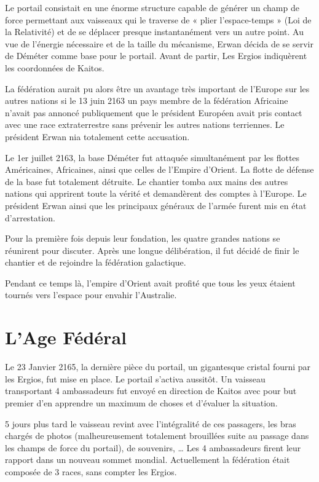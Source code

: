 \begin{multicols}{2}
Le portail consistait en une énorme structure capable de générer un champ de force permettant aux vaisseaux qui le traverse de « plier l’espace-temps » (Loi de la Relativité) et de se déplacer presque instantanément vers un autre point. Au vue de l’énergie nécessaire et de la taille du mécanisme, Erwan décida de se servir de Déméter comme base pour le portail. Avant de partir, Les Ergios indiquèrent les coordonnées de Kaitos.

La fédération aurait pu alors être un avantage très important de l’Europe sur les autres nations si le 13 juin 2163 un pays membre de la fédération Africaine n’avait pas annoncé publiquement que le président Européen avait pris contact avec une race extraterrestre sans prévenir les autres nations terriennes. Le président Erwan nia totalement cette accusation.

Le 1er juillet 2163, la base Déméter fut attaquée simultanément par les flottes Américaines, Africaines, ainsi que celles de l’Empire d’Orient. La flotte de défense de la base fut totalement détruite. Le chantier tomba aux mains des autres nations qui apprirent toute la vérité et demandèrent des comptes à l’Europe. Le président Erwan ainsi que les principaux généraux de l’armée furent mis en état d’arrestation.

Pour la première fois depuis leur fondation, les quatre grandes nations se réunirent pour discuter. Après une longue délibération, il fut décidé de finir le chantier et de rejoindre la fédération galactique.

Pendant ce temps là, l’empire d’Orient avait profité que tous les yeux étaient tournés vers l’espace pour envahir l’Australie.

\section{L’Age Fédéral}

Le 23 Janvier 2165, la dernière pièce du portail, un gigantesque cristal fourni par les Ergios, fut mise en place. Le portail s’activa aussitôt. Un vaisseau transportant 4 ambassadeurs fut envoyé en direction de Kaitos avec pour but premier d’en apprendre un maximum de choses et d’évaluer la situation. 

5 jours plus tard le vaisseau revint avec l’intégralité de ces passagers, les bras chargés de photos (malheureusement totalement brouillées suite au passage dans les champs de force du portail), de souvenirs, … Les 4 ambassadeurs firent leur rapport dans un nouveau sommet mondial. Actuellement la fédération était composée de 3 races, sans compter les Ergios.


\end{multicols}
